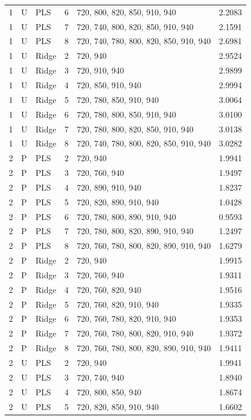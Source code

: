 \documentclass[10pt,a4paper]{article}
\begin{document}
\begin{landscape}
\begin{longtable}{rllrlr}
1 & U & PLS & 6 & 720, 800, 820, 850, 910, 940 & 2.2083 \\
1 & U & PLS & 7 & 720, 740, 800, 820, 850, 910, 940 & 2.1591 \\
1 & U & PLS & 8 & 720, 740, 780, 800, 820, 850, 910, 940 & 2.6981 \\
1 & U & Ridge & 2 & 720, 940 & 2.9524 \\
1 & U & Ridge & 3 & 720, 910, 940 & 2.9899 \\
1 & U & Ridge & 4 & 720, 850, 910, 940 & 2.9994 \\
1 & U & Ridge & 5 & 720, 780, 850, 910, 940 & 3.0064 \\
1 & U & Ridge & 6 & 720, 780, 800, 850, 910, 940 & 3.0100 \\
1 & U & Ridge & 7 & 720, 780, 800, 820, 850, 910, 940 & 3.0138 \\
1 & U & Ridge & 8 & 720, 740, 780, 800, 820, 850, 910, 940 & 3.0282 \\
2 & P & PLS & 2 & 720, 940 & 1.9941 \\
2 & P & PLS & 3 & 720, 760, 940 & 1.9497 \\
2 & P & PLS & 4 & 720, 890, 910, 940 & 1.8237 \\
2 & P & PLS & 5 & 720, 820, 890, 910, 940 & 1.0428 \\
2 & P & PLS & 6 & 720, 780, 800, 890, 910, 940 & 0.9593 \\
2 & P & PLS & 7 & 720, 780, 800, 820, 890, 910, 940 & 1.2497 \\
2 & P & PLS & 8 & 720, 760, 780, 800, 820, 890, 910, 940 & 1.6279 \\
2 & P & Ridge & 2 & 720, 940 & 1.9915 \\
2 & P & Ridge & 3 & 720, 760, 940 & 1.9311 \\
2 & P & Ridge & 4 & 720, 760, 820, 940 & 1.9516 \\
2 & P & Ridge & 5 & 720, 760, 820, 910, 940 & 1.9335 \\
2 & P & Ridge & 6 & 720, 760, 780, 820, 910, 940 & 1.9353 \\
2 & P & Ridge & 7 & 720, 760, 780, 800, 820, 910, 940 & 1.9372 \\
2 & P & Ridge & 8 & 720, 760, 780, 800, 820, 890, 910, 940 & 1.9411 \\
2 & U & PLS & 2 & 720, 940 & 1.9941 \\
2 & U & PLS & 3 & 720, 740, 940 & 1.8940 \\
2 & U & PLS & 4 & 720, 800, 850, 940 & 1.8674 \\
2 & U & PLS & 5 & 720, 820, 850, 910, 940 & 1.6602 \\

\end{longtable}
\end{landscape}
\end{document}
